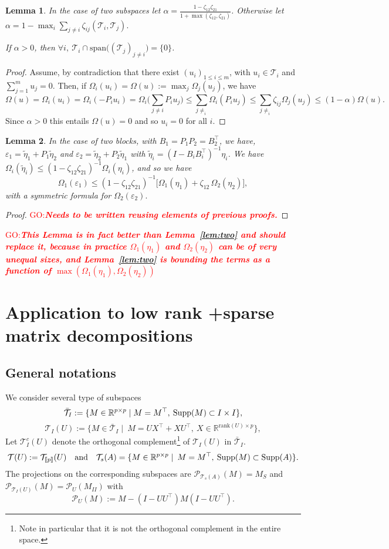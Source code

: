 \documentclass{article}
\def\RR{\mathbb{R}}
\def\T{\mathcal{T}}
\def\supp{{\rm Supp}}
\def\xxi{\zeta}
\newcommand{\tred}[1]{\textcolor{red}{#1}}
\newtheorem{lemma}{Lemma}
\newcommand{\GO}[1]{\tred{GO:\textbf{\emph{#1}}}}
\begin{document}
\begin{lemma}
\label{lem:zero_inter}
In the case of two subspaces let $\alpha=\frac{1-\xxi_{12}\xxi_{21}}{1+\max(\xxi_{12},\xxi_{21})}$. Otherwise let $\alpha=1-\max_{i} \sum_{j\neq i} \xxi_{ij}(\T_i,\T_j).$

If $\alpha>0$, then $\forall i, \: \T_i \cap \text{span}\big ( (\T_j)_{j\neq i}\big) =\{0\}$.
\end{lemma}
\begin{proof}
Assume, by contradiction that there exist $(u_i)_{1\leq i\leq m}$, with $u_i \in \T_i$ and
$\sum_{j=1}^m u_j=0$. Then, if $\Omega_i(u_i)=\Omega(u):=\max_j \Omega_j(u_j)$, we have 
$$\Omega(u)=\Omega_i(u_i)=\Omega_i(-P_i u_i)=\Omega_i \big ( \sum_{j \neq i} P_i u_j \big ) \leq \sum_{j \neq _i} \Omega_i(P_i u_j) \leq \sum_{j \neq _i} \xxi_{ij} \Omega_j(u_j) \leq (1-\alpha) \Omega(u).$$ Since $\alpha>0$ this entails $\Omega(u)=0$ and so $u_i=0$ for all $i$. 
\end{proof}

\begin{lemma}
\label{lem:new}
In the case of two blocks,  with $B_1=P_1 P_2=B_2^\top$, we have,
$\varepsilon_1=\tilde{\eta}_1+P_1 \tilde{\eta}_2$ and $\varepsilon_2=\tilde{\eta}_2+P_2 \tilde{\eta}_1$ with $\tilde{\eta}_i=(I-B_iB_i^\top)^{-1}{\eta}_i$. We have 
$\Omega_i(\tilde{\eta}_i)\leq (1-\zeta_{12}\zeta_{21})^{-1}\Omega_i(\eta_i)$, and so we have
$$\Omega_1(\varepsilon_1) \leq (1-\zeta_{12}\zeta_{21})^{-1}  \big [ \Omega_1(\eta_1)+\zeta_{12} \, \Omega_2(\eta_2) \big ],$$
with a symmetric formula for $\Omega_2(\varepsilon_2).$
\end{lemma}
\begin{proof}
\GO{Needs to be written reusing elements of previous proofs.}
\end{proof}

\GO{This Lemma is in fact better than Lemma~\ref{lem:two} and should replace it, because in practice $\Omega_1(\eta_1)$ and $\Omega_2(\eta_2)$ can be of very unequal sizes, and Lemma~\ref{lem:two} is bounding the terms as a function of $\max(\Omega_1(\eta_1),\Omega_2(\eta_2))$}

\section{Application to low rank +sparse matrix decompositions}
\subsection{General notations}
We consider several type of subspaces
$$\bar{\T}_I:=\{M \in \RR^{p \times p}\mid  M=M^\top, \: \supp(M)\subset I \times I\},$$
$$\T_I(U):=\{M \in \bar{\T}_I\mid \: M=UX^\top+XU^\top,\: X \in \RR^{\text{rank}(U) \times p} \},$$
Let $\T^c_I(U)$ denote the orthogonal complement\footnote{Note in particular that it is not the orthogonal complement in the entire space.} of $\T_I(U)$ in $\bar{\T}_I$. 
$$\T(U):=\T_{[\![p]\!]}(U)\quad \text{and} \quad \T_s(A)=\{M \in \RR^{p \times p}\mid  \: M=M^\top, \: \supp(M)\subset \supp(A)\}.$$
The projections on the corresponding subspaces are $\mathcal{P}_{\T_s(A)}(M)=M_S$ and $\mathcal{P}_{\T_I(U)}(M)=\mathcal{P}_{U}(M_{II})$ with $$\mathcal{P}_U(M):=M-(I-UU^\top)M(I-UU^\top).$$
\end{document}
